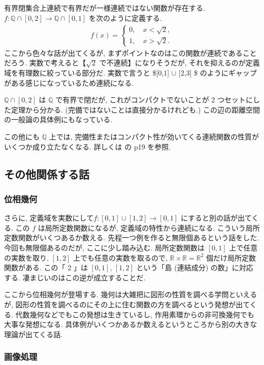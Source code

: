 \documentclass[openany, a4paper, oneside]{jsbook}
\theoremstyle{break}
\theoremstyle{breakdefn}
\begin{document}
有界閉集合上連続で有界だが一様連続ではない関数が存在する.
$f \colon \mathbb{Q} \cap [0, 2] \to \mathbb{Q} \cap [0, 1]$ を次のように定義する.
\begin{align}
 f (x)
 =
 \begin{cases}
  0, \quad x < \sqrt{2}, \\
  1, \quad x > \sqrt{2}.
 \end{cases}
\end{align}
ここから色々な話が出てくるが, まずポイントなのはこの関数が連続であることだろう.
実数で考えると【$\sqrt{2}$ で不連続】になりそうだが, それを抑えるのが定義域を有理数に絞っている部分だ.
実数で言うと \$[0,1] $\cup$ [2,3] \$ のようにギャップがある感じになっているため連続になる.

$\mathbb{Q} \cap[0, 2]$ は $\mathbb{Q}$ で有界で閉だが,
これがコンパクトでないことが 2 つセットにした定理から分かる.
(完備ではないことは直接分かるけれども.)
この辺の距離空間の一般論の具体例にもなっている.

この他にも $\mathbb{Q}$ 上では, 完備性またはコンパクト性が効いてくる連続関数の性質がいくつか成り立たなくなる.
詳しくは \cite{GelbaumOlmsted1} の p19 を参照.
\subsection{その他関係する話}

\subsubsection{位相幾何}


さらに, 定義域を実数にして$f \colon [0,1] \cup [1,2] \to [0,1]$ にすると別の話が出てくる.
この $f$ は局所定数関数になるが, 定義域の特性から連続になる.
こういう局所定数関数がいくつあるか数える.
先程一つ例を作ると無限個あるという話をした.
今回も無限個あるのだが, ここに少し踏み込む.
局所定数関数は $[0,1]$ 上で任意の実数を取り, $[1,2]$ 上でも任意の実数を取るので,
$\mathbb{R} \times \mathbb{R} = \mathbb{R}^2$ 個だけ局所定数関数がある.
この「 2 」は $[0,1]$, $[1,2]$ という「島 (連結成分) の数」に対応する.
凄まじいのはこの逆が成立することだ.

ここから位相幾何が登場する.
幾何は大雑把に図形の性質を調べる学問といえるが, 図形の性質を調べるのにその上に住む関数の方を調べるという発想が出てくる.
代数幾何などでもこの発想は生きているし, 作用素環からの非可換幾何でも大事な発想になる.
具体例がいくつかあるか数えるというところから別の大きな理論が出てくる話.
\subsubsection{画像処理}
\end{document}
